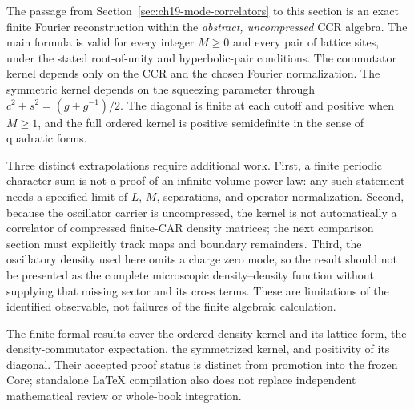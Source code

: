 The passage from Section~\ref{sec:ch19-mode-correlators} to this
section is an exact finite Fourier reconstruction within the
\emph{abstract, uncompressed} CCR algebra.  The main formula is
valid for every integer $M\geq0$ and every pair of lattice sites,
under the stated root-of-unity and hyperbolic-pair conditions.
The commutator kernel depends only on the CCR and the chosen Fourier
normalization.  The symmetric kernel depends on the squeezing
parameter through $c^2+s^2=(g+g^{-1})/2$.  The diagonal is finite at
each cutoff and positive when $M\geq1$, and the full ordered kernel
is positive semidefinite in the sense of quadratic forms.

Three distinct extrapolations require additional work.  First,
a finite periodic character sum is not a proof of an infinite-volume
power law: any such statement needs a specified limit of $L$, $M$,
separations, and operator normalization.  Second, because the
oscillator carrier is uncompressed, the kernel is not automatically
a correlator of compressed finite-CAR density matrices; the next
comparison section must explicitly track maps and boundary
remainders.  Third, the oscillatory density used here omits a charge
zero mode, so the result should not be presented as the complete
microscopic density--density function without supplying that missing
sector and its cross terms.  These are limitations of the identified
observable, not failures of the finite algebraic calculation.

The finite formal results cover the ordered density kernel and its lattice
form, the density-commutator expectation, the symmetrized kernel, and
positivity of its diagonal. Their accepted proof status is distinct from
promotion into the frozen Core; standalone LaTeX compilation also does not
replace independent mathematical review or whole-book integration.
